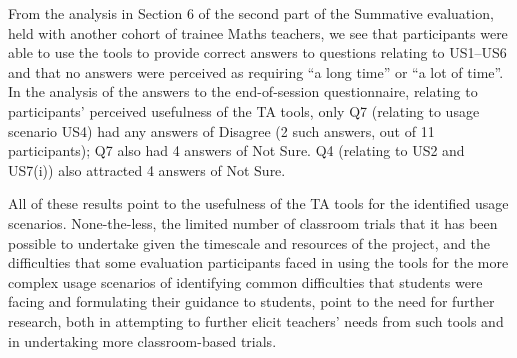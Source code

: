 From the analysis in Section 6 of the second part of the Summative
evaluation, held with another cohort of trainee Maths teachers, 
we see that participants were able to use the tools to provide
correct answers to questions relating to US1--US6 and that no
answers were perceived as requiring ``a long time'' or ``a lot of time''.
In the analysis of the answers to the end-of-session questionnaire,
relating to participants' perceived usefulness of the TA tools, 
only Q7 (relating to usage scenario US4) had any answers of Disagree 
(2 such answers, out of 11 participants); Q7 also had 4 answers of Not Sure.
Q4 (relating to US2 and US7(i)) also attracted 4 answers of Not Sure. 


All of these results point to the usefulness of the TA tools for the
identified usage scenarios. 
None-the-less, the limited number of classroom trials that
it has been possible to undertake given the timescale and resources of
the project, and the difficulties that some evaluation participants
faced in using the tools for the more complex usage scenarios of
identifying common difficulties that students were facing and
formulating their guidance to students, point to the need for
further research, both in attempting to further elicit teachers' needs
from such tools and in undertaking more classroom-based trials.


% 
% 
 
